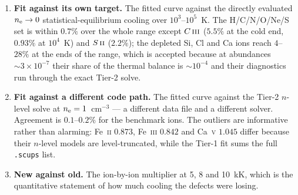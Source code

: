 \documentclass[english,a4paper]{my_memo}
\newcommand{\code}[1]{\texttt{#1}}
\newcommand{\CIII}{C\,\textsc{iii}}
\newcommand{\SII}{S\,\textsc{ii}}
\newcommand{\nel}{n_{\rm e}}
\begin{document}
\begin{enumerate}\itemsep2pt
\item \textbf{Fit against its own target.}  The fitted curve against the
      directly evaluated $\nel \to 0$ statistical-equilibrium cooling over
      $10^3$--$10^5$~K.  The H/C/N/O/Ne/S set is within $0.7\%$ over the whole
      range except $\CIII{}$ ($5.5\%$ at the cold end, $0.93\%$ at $10^4$~K)
      and $\SII{}$ ($2.2\%$); the depleted Si, Cl and Ca ions reach $4$--$28\%$
      at the ends of the range, which is accepted because at abundances
      $\sim 3\times10^{-7}$ their share of the thermal balance is $\sim
      10^{-4}$ and their diagnostics run through the exact Tier-2 solve.
\item \textbf{Fit against a different code path.}  The fitted curve against
      the Tier-2 $n$-level solve at $\nel = 1$~cm$^{-3}$ --- a different data
      file and a different solver.  Agreement is $0.1$--$0.2\%$ for the
      benchmark ions.  The outliers are informative rather than alarming:
      Fe~\textsc{ii} $0.873$, Fe~\textsc{iii} $0.842$ and Ca~\textsc{v}
      $1.045$ differ because their $n$-level models are level-truncated, while
      the Tier-1 fit sums the full \code{.scups} list.
\item \textbf{New against old.}  The ion-by-ion multiplier at 5, 8 and
      10~kK, which is the quantitative statement of how much cooling the
      defects were losing.
\end{enumerate}
\end{document}
